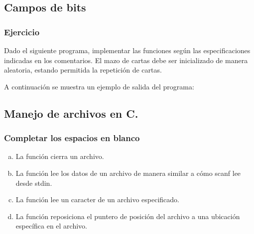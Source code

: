 \subsection*{Campos de bits}
\subsubsection{Ejercicio}
Dado el siguiente programa, implementar las funciones según las especificaciones indicadas en los comentarios.
El mazo de cartas debe ser inicializado de manera aleatoria, estando permitida la repetición de cartas.
\lstset{inputencoding=utf8/latin1}

\pagebreak
A continuación se muestra un ejemplo de salida del programa:
\lstset{inputencoding=utf8/latin1}
{\small

}

\subsection*{Manejo de archivos en C.}

\subsubsection{Completar los espacios en blanco}
\begin{enumerate}[a)]
  \item La función \underspace cierra un archivo.
  \item La función \underspace lee los datos de un archivo de manera similar a cómo scanf lee desde stdin.
  \item La función \underspace lee un caracter de un archivo especificado.
  \item La función \underspace reposiciona el puntero de posición del archivo a una ubicación específica en el archivo.
\end{enumerate}
